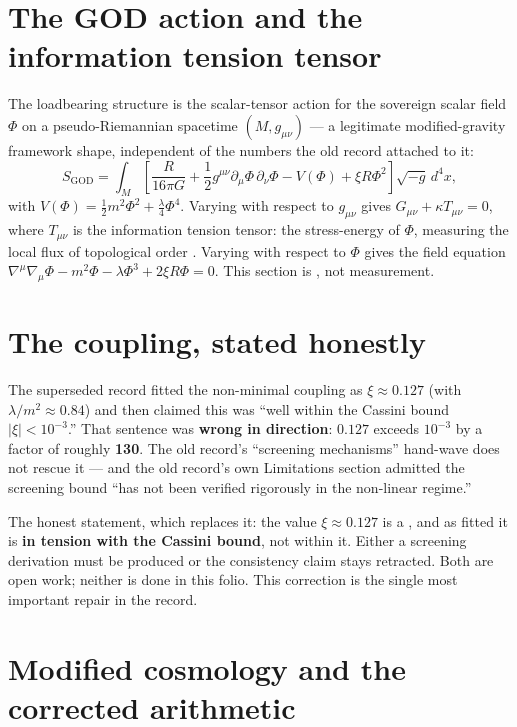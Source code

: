 \documentclass{alienfolio}
\begin{document}
\section{The GOD action and the information tension tensor}
\label{sec:action}

The loadbearing structure is the scalar-tensor action for the
sovereign scalar field $\Phi$ on a pseudo-Riemannian spacetime
$(M, g_{\mu\nu})$ --- a legitimate modified-gravity framework shape,
independent of the numbers the old record attached to it:
\begin{equation}
S_{\mathrm{GOD}} = \int_M \left[\frac{R}{16\pi G}
+ \frac{1}{2}g^{\mu\nu}\partial_\mu\Phi\,\partial_\nu\Phi
- V(\Phi) + \xi R\Phi^2\right]\sqrt{-g}\,d^4x,
\end{equation}
with $V(\Phi) = \frac{1}{2}m^2\Phi^2 + \frac{\lambda}{4}\Phi^4$.
Varying with respect to $g_{\mu\nu}$ gives $G_{\mu\nu} + \kappa
T_{\mu\nu} = 0$, where $T_{\mu\nu}$ is the information tension
tensor: the stress-energy of $\Phi$, measuring the local flux of
topological order . Varying with respect to
$\Phi$ gives the field equation
$\nabla^\mu\nabla_\mu\Phi - m^2\Phi - \lambda\Phi^3 + 2\xi R\Phi = 0$.
This section is , not measurement.

\section{The coupling, stated honestly}
\label{sec:coupling}

The superseded record fitted the non-minimal coupling as
$\xi \approx 0.127$ (with $\lambda/m^2 \approx 0.84$) and then
claimed this was ``well within the Cassini bound $|\xi| < 10^{-3}$.''
That sentence was \textbf{wrong in direction}: $0.127$ exceeds
$10^{-3}$ by a factor of roughly \textbf{130}. The old record's
``screening mechanisms'' hand-wave does not rescue it --- and the old
record's own Limitations section admitted the screening bound ``has
not been verified rigorously in the non-linear regime.''

The honest statement, which replaces it: the value $\xi \approx
0.127$ is a , and as fitted it is \textbf{in tension with
the Cassini bound}, not within it. Either a screening derivation
must be produced or the consistency claim stays retracted. Both are
open work; neither is done in this folio. This correction is the
single most important repair in the record.

\section{Modified cosmology and the corrected arithmetic}
\label{sec:cosmology}
\end{document}
